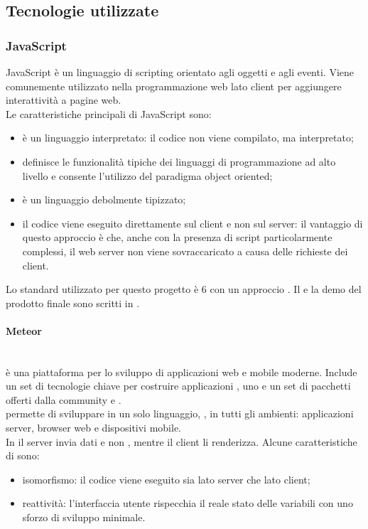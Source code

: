 \subsection{Tecnologie utilizzate}
\subsubsection{JavaScript}
JavaScript è un linguaggio di scripting orientato agli oggetti e agli eventi. Viene comunemente utilizzato nella programmazione web lato client per aggiungere interattività a pagine web.\\
Le caratteristiche principali di JavaScript sono:
\begin{itemize}
	\item è un linguaggio interpretato: il codice non viene compilato, ma interpretato;
	\item definisce le funzionalità tipiche dei linguaggi di programmazione ad alto livello e consente l'utilizzo del paradigma object oriented;
	\item è un linguaggio debolmente tipizzato;
	\item il codice viene eseguito direttamente sul client e non sul server: il vantaggio di questo approccio è che, anche con la presenza di script particolarmente complessi, il web server non viene sovraccaricato a causa delle richieste dei client.
\end{itemize}
Lo standard utilizzato per questo progetto è  6 con un approccio .
Il  e la demo del prodotto finale sono scritti in .

\paragraph{Meteor}\mbox{}\\
 è una piattaforma   per lo sviluppo di applicazioni web e mobile moderne. Include un set di tecnologie chiave per costruire applicazioni , uno  e un set di pacchetti offerti dalla community  e .\\
 permette di sviluppare in un solo linguaggio, , in tutti gli ambienti: applicazioni server, browser web e dispositivi mobile.\\
In  il server invia dati e non , mentre il client li renderizza.
Alcune caratteristiche di  sono:
\begin{itemize}
	\item isomorfismo: il codice viene eseguito sia lato server che lato client;
	\item reattività: l'interfaccia utente rispecchia il reale stato delle variabili con uno sforzo di sviluppo minimale.
\end{itemize}

